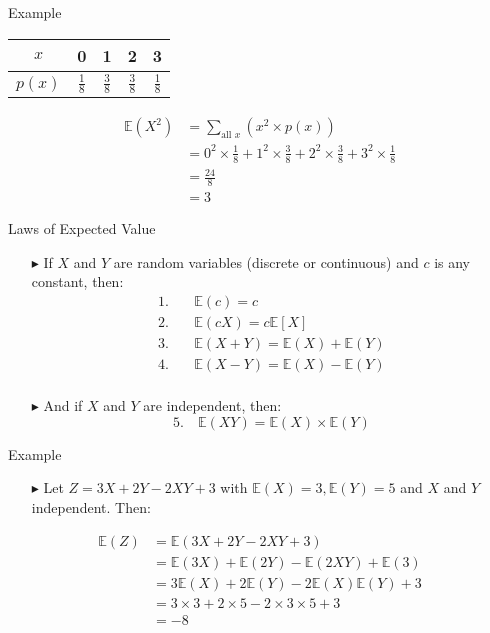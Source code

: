 \documentclass[12pt]{beamer}
\newcommand{\E}{\mathbb{E}}
\begin{document}
\begin{frame}{Example}
	\begin{center}
		\begin{tabular}{ccccc}
			\toprule
			$x$&0&1&2&3\\
			\toprule
			$p(x)$&$\frac{1}{8}$&$\frac{3}{8}$&$\frac{3}{8}$&$\frac{1}{8}$\\
			\bottomrule
		\end{tabular}
	\end{center}
	
	\begin{align*}
		\mathbb E(X^2)&=\sum_{\text{all }x}(x^2\times p(x))\\
		&=0^2\times\frac{1}{8}+1^2\times\frac{3}{8}+2^2\times\frac{3}{8}+3^2\times\frac{1}{8}\\
		&=\frac{24}{8}\\
		&=3
	\end{align*}
\end{frame}

\begin{frame}{Laws of Expected Value}
	\begin{itemize}
		\item[\color{blue}$\blacktriangleright$] If $X$ and $Y$ are random variables (discrete or continuous) and $c$ is any constant, then:
		\begin{align*}
			1. & \quad \E(c)=c \\
			2. & \quad \E(cX)=c\E[X]\\
			3. & \quad \E(X+Y)=\E(X)+\E(Y)\\
			4. & \quad \E(X-Y)=\E(X)-\E(Y)\\
		\end{align*}
		\item[\color{blue}$\blacktriangleright$] And if $X$ and $Y$ are independent, then:
		$$5. \quad \E(XY)=\E(X)\times \E(Y)$$
	\end{itemize}
\end{frame}

\begin{frame}{Example}
	\begin{itemize}
		\item[\color{blue}$\blacktriangleright$] Let $Z = 3X + 2Y - 2XY + 3$ with $\E(X) = 3, \E(Y) = 5$ and $X$ and $Y$ independent. Then:
	\end{itemize}

\begin{align*}
\E(Z) &= \E(3X + 2Y - 2XY + 3)\\
&= \E(3X) + \E(2Y) - \E(2XY) + \E(3)\\
&= 3\E(X) + 2\E(Y) - 2\E(X)\E(Y) + 3\\
&= 3 \times 3 + 2 \times 5 - 2 \times 3 \times 5 + 3\\
&= -8
\end{align*}
\end{frame}
\end{document}
